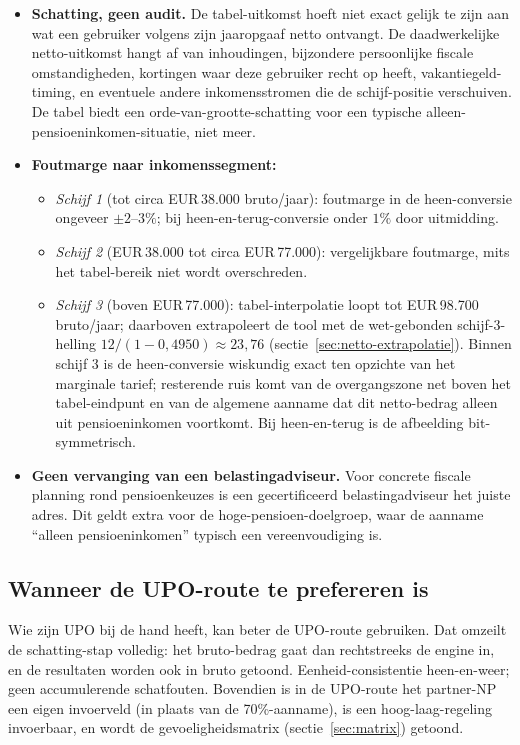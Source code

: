 \documentclass[11pt,a4paper]{article}
\begin{document}
\begin{itemize}
\item \textbf{Schatting, geen audit.} De tabel-uitkomst hoeft niet exact gelijk te zijn aan wat een gebruiker volgens zijn jaaropgaaf netto ontvangt. De daadwerkelijke netto-uitkomst hangt af van inhoudingen, bijzondere persoonlijke fiscale omstandigheden, kortingen waar deze gebruiker recht op heeft, vakantiegeld-timing, en eventuele andere inkomensstromen die de schijf-positie verschuiven. De tabel biedt een orde-van-grootte-schatting voor een typische alleen-pensioeninkomen-situatie, niet meer.
\item \textbf{Foutmarge naar inkomenssegment:}
\begin{itemize}
\item \emph{Schijf 1} (tot circa EUR\,38.000 bruto/jaar): foutmarge in de heen-conversie ongeveer $\pm 2$--$3\%$; bij heen-en-terug-conversie onder $1\%$ door uitmidding.
\item \emph{Schijf 2} (EUR\,38.000 tot circa EUR\,77.000): vergelijkbare foutmarge, mits het tabel-bereik niet wordt overschreden.
\item \emph{Schijf 3} (boven EUR\,77.000): tabel-interpolatie loopt tot EUR\,98.700 bruto/jaar; daarboven extrapoleert de tool met de wet-gebonden schijf-3-helling $12/(1-0{,}4950) \approx 23{,}76$ (sectie~\ref{sec:netto-extrapolatie}). Binnen schijf 3 is de heen-conversie wiskundig exact ten opzichte van het marginale tarief; resterende ruis komt van de overgangszone net boven het tabel-eindpunt en van de algemene aanname dat dit netto-bedrag alleen uit pensioeninkomen voortkomt. Bij heen-en-terug is de afbeelding bit-symmetrisch.
\end{itemize}
\item \textbf{Geen vervanging van een belastingadviseur.} Voor concrete fiscale planning rond pensioenkeuzes is een gecertificeerd belastingadviseur het juiste adres. Dit geldt extra voor de hoge-pensioen-doelgroep, waar de aanname ``alleen pensioeninkomen'' typisch een vereenvoudiging is.
\end{itemize}

\subsection{Wanneer de UPO-route te prefereren is}

Wie zijn UPO bij de hand heeft, kan beter de UPO-route gebruiken. Dat omzeilt de schatting-stap volledig: het bruto-bedrag gaat dan rechtstreeks de engine in, en de resultaten worden ook in bruto getoond. Eenheid-consistentie heen-en-weer; geen accumulerende schatfouten. Bovendien is in de UPO-route het partner-NP een eigen invoerveld (in plaats van de 70\%-aanname), is een hoog-laag-regeling invoerbaar, en wordt de gevoeligheidsmatrix (sectie~\ref{sec:matrix}) getoond.
\end{document}
